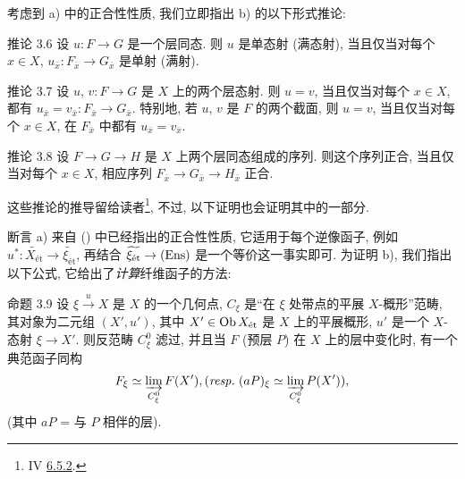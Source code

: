考虑到 a) 中的正合性性质, 我们立即指出 b) 的以下形式推论:

\begin{enonce*}{推论 3.6}
设 $u : F \to G$ 是一个层同态.
则 $u$ 是单态射 (\resp 满态射), 当且仅当对每个 $x \in X$,
$u_{\bar{x}}:F_{\bar{x}}\to G_{\bar{x}}$ 是单射 (\resp 满射).
\end{enonce*}

\begin{enonce*}{推论 3.7}
设 $u$, $v : F \to G$ 是 $X$ 上的两个层态射.
则 $u = v$, 当且仅当对每个 $x \in X$,
都有 $u_{\bar{x}} = v_{\bar{x}} : F_{\bar{x}} \to G_{\bar{x}}$.
特别地, 若 $u$, $v$ 是 $F$ 的两个截面, 则\pageoriginale
$u = v$, 当且仅当对每个 $x \in X$,
在 $F_{\bar{x}}$ 中都有 $u_{\bar{x}} = v_{\bar{x}}$.
\end{enonce*}

\begin{enonce*}{推论 3.8}
设 $F \to G \to H$ 是 $X$ 上两个层同态组成的序列.
则这个序列正合, 当且仅当对每个 $x \in X$,
相应序列 $F_{\bar{x}} \to G_{\bar{x}} \to H_{\bar{x}}$ 正合.
\end{enonce*}

这些推论的推导留给读者\footnote{\Cf IV \hyperref[IV.exer6.5.2]{6.5.2}.},
不过, 以下证明也会证明其中的一部分.

断言 a) 来自 () 中已经指出的正合性性质,
它适用于每个逆像函子, 例如
$u^{\ast} : \widetilde{X_{\text{ét}}} \to
\widetilde{\xi_{\text{ét}}}$,
再结合 $\widetilde{\xi_{\text{ét}}} \to (\Ens)$ 是一个等价这一事实即可.
为证明 b), 我们指出以下公式, 它给出了\emph{计算}纤维函子的方法:

\begin{enonce*}{命题 3.9\footnotemark}
设 $\xi \xrightarrow{u} X$ 是 $X$ 的一个几何点,
$C_{\xi}$ 是“在 $\xi$ 处带点的平展 $X$-概形”范畴,
\ie 其对象为二元组 $(X', u')$,
其中 $X'\in \operatorname{Ob} X_{\text{\rm ét}}$ 是 $X$ 上的平展概形,
$u'$ 是一个 $X$-态射 $\xi \to X'$.
则反范畴 $C^{0}_{\xi}$ 滤过, 并且当 $F$
(\resp 预层 $P$) 在 $X$ 上的层中变化时, 有一个典范函子同构
$$
F_{\xi} \simeq \varinjlim_{C^{0}_{\xi}} F(X'), (\emph{resp.\kern.3em}
(aP)_{\xi} \simeq \varinjlim_{C^{0}_{\xi}} P(X')){},
$$
(其中 $aP$ = 与 $P$ 相伴的层).
\end{enonce*}

